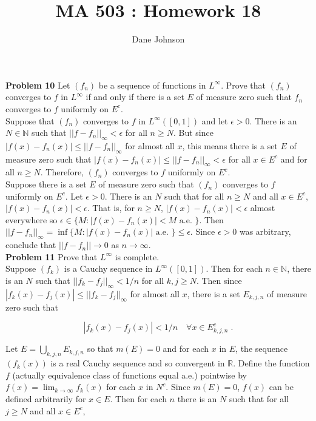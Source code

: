\documentclass[a4paper]{article}
\title{MA 503 : Homework 18}
\author{Dane Johnson}
\begin{document}
\maketitle

{\bf Problem 10} Let $(f_n)$ be a sequence of functions in $L^\infty$. Prove that $(f_n)$ converges to $f$ in $L^\infty$ if and only if there is a set $E$ of measure zero such that $f_n$ converges to $f$ uniformly on $E^c$. \\

Suppose that $(f_n)$ converges to $f$ in $L^\infty([0,1])$ and let $\epsilon > 0$. There is an $N \in \mathbb{N}$ such that $||f - f_n||_\infty < \epsilon$ for all $n \geq N$. But since $|f(x) - f_n(x)| \leq ||f - f_n||_\infty$ for almost all $x$, this means there is a set $E$ of measure zero such that $|f(x) - f_n(x)| \leq ||f- f_n||_\infty < \epsilon$ for all $x \in E^c$ and for all $n \geq N$. Therefore, $(f_n)$ converges to $f$ uniformly on $E^c$. \\

Suppose there is a set $E$ of measure zero such that $(f_n)$ converges to $f$ uniformly on $E^c$. Let $\epsilon > 0$. There is an $N$ such that for all $n\geq N$ and all $x \in E^c$, $|f(x) - f_n(x)| < \epsilon$. That is, for $n \geq N$, $|f(x) - f_n(x)| < \epsilon$ almost everywhere so $\epsilon \in \{M : |f(x) - f_n(x)| < M \text{ a.e. } \}$. Then $||f- f_n||_\infty = \inf \{M : |f(x) - f_n(x)| \text{ a.e. } \} \leq \epsilon$. Since $\epsilon > 0$ was arbitrary, conclude that $||f - f_n|| \rightarrow 0 $ as $n \rightarrow \infty$. \\

{\bf Problem 11} Prove that $L^\infty$ is complete.\\

Suppose $(f_k)$ is a Cauchy sequence in $L^\infty([0,1])$. Then for each $n \in \mathbb{N}$, there is an $N$ such that $||f_k - f_j||_\infty < 1/n$ for all $k,j \geq N$. Then since $|f_k(x) - f_j(x)| \leq ||f_k - f_j||_\infty$ for almost all $x$, there is a set $E_{k,j,n}$ of measure zero such that 

$$|f_k(x) - f_j(x)| < 1/n \quad \forall x \in E_{k,j,n}^c \;.$$

Let $E = \bigcup_{k,j,n} E_{k,j,n}$ so that $m(E) = 0$ and for each $x$ in $E$, the sequence $(f_k(x))$ is a real Cauchy sequence and so convergent in $\mathbb{R}$. Define the function $f$ (actually equivalence class of functions equal a.e.) pointwise by $f(x) = \lim_{k\rightarrow \infty} f_k(x)$ for each $x$ in $N^c$. Since $m(E) = 0$, $f(x)$ can be defined arbitrarily for $x \in E$. Then for each $n$ there is an $N$ such that for all $j \geq N$ and all $x \in E^c$,
\end{document}
